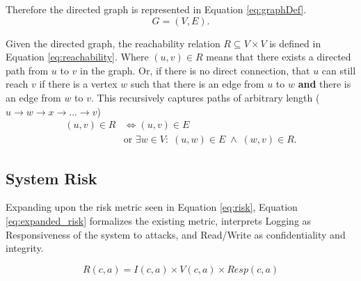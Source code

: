 Therefore the directed graph is represented in Equation \ref{eq:graphDef}.
\begin{equation}
    \label{eq:graphDef}
    G = (V,E).
\end{equation}

Given the directed graph, the reachability relation $R \subseteq V \times V$ is defined in Equation \ref{eq:reachability}. Where $(u,v) \in R$ means that there exists a directed path from $u$ to $v$ in the graph. Or, if there is no direct connection, that $u$ can still reach $v$ if there is a vertex $w$ such that there is an edge from $u$ to $w$ \textbf{and} there is an edge from $w$ to $v$. This recursively captures paths of arbitrary length ($u \rightarrow w \rightarrow x \rightarrow ... \rightarrow v$)
\begin{equation}
    \label{eq:reachability}
        \begin{aligned}
        (u,v) \in R & \iff (u,v) \in E \\
        & \text{or } \exists w \in V:\; (u,w) \in E \;\wedge\; (w,v) \in R.
    \end{aligned}
\end{equation}






\subsection{System Risk}

Expanding upon the risk metric seen in Equation \ref{eq:risk}, Equation \ref{eq:expanded_risk} formalizes the existing metric, interprets Logging as Responsiveness of the system to attacks, and Read/Write as confidentiality and integrity. 



\begin{equation}
    \label{eq:expanded_risk}
    R(c,a) = I(c,a) \times V(c,a) \times Resp(c,a)
\end{equation}

